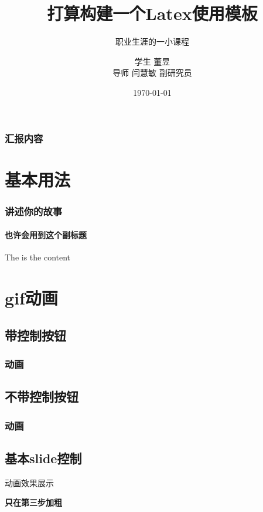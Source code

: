 \documentclass{beamer}
\title[Latex使用模板]{打算构建一个Latex使用模板}
\subtitle[课程]{职业生涯的一小课程}
\author[Dong Yu]{{\small 学生 董昱 \\ 导师 闫慧敏 副研究员}}
\date[\today]{\today}
\institute[中科院地理所]{中国科学地理科学与资源研究所\par 中国科学院大学}
\begin{document}
	
	\frame{\titlepage}

	\begin{frame}[label = outline]
		\frametitle{汇报内容}
		\tableofcontents
	\end{frame}

	\section{基本用法}

	\begin{frame}[c] %
		\frametitle{讲述你的故事}
		\framesubtitle{也许会用到这个副标题}
		The is the content
		
		\hyperlink{outline}{}
	\end{frame}

	\section{gif动画}
	
	\subsection{带控制按钮}
	
	\begin{frame}[c] %
		\frametitle{动画}


	\end{frame}

	\subsection{不带控制按钮}

	\begin{frame}[c]
		\frametitle{动画}


	\end{frame}

	\subsection{基本slide控制}

	\begin{frame}{动画效果展示}  
		\onslide<1>{只有第一部}  
		
		
		
		\textbf<3>{只在第三步加粗} 
	\end{frame}  
\end{document}
